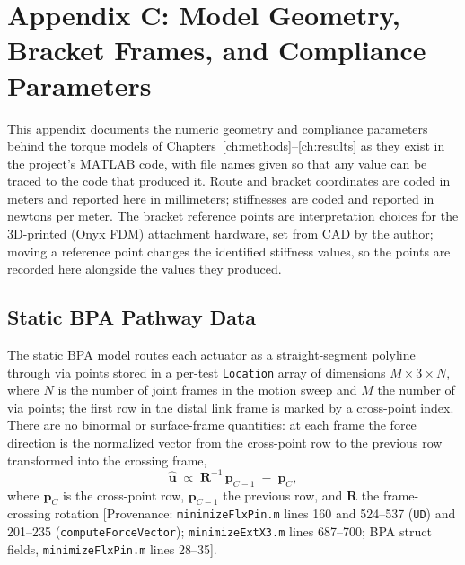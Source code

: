\chapter{Appendix C: Model Geometry, Bracket Frames, and Compliance Parameters}\label{app:model_geometry}
\graphicspath{{figs/94-AppendixC/}}

This appendix documents the numeric geometry and compliance parameters behind the torque models of Chapters~\ref{ch:methods}--\ref{ch:results} as they exist in the project's MATLAB code, with file names given so that any value can be traced to the code that produced it. Route and bracket coordinates are coded in meters and reported here in millimeters; stiffnesses are coded and reported in newtons per meter. The bracket reference points are interpretation choices for the 3D-printed (Onyx FDM) attachment hardware, set from CAD by the author; moving a reference point changes the identified stiffness values, so the points are recorded here alongside the values they produced.

\section{Static BPA Pathway Data}

The static BPA model routes each actuator as a straight-segment polyline through via points stored in a per-test \texttt{Location} array of dimensions $M\times3\times N$, where $N$ is the number of joint frames in the motion sweep and $M$ the number of via points; the first row in the distal link frame is marked by a cross-point index. There are no binormal or surface-frame quantities: at each frame the force direction is the normalized vector from the cross-point row to the previous row transformed into the crossing frame,
\begin{equation}
    \hat{\mathbf{u}} \;\propto\; \mathbf{R}^{-1}\,\mathbf{p}_{C-1} \;-\; \mathbf{p}_{C},
    \label{eq:app_forcedir}
\end{equation}
where $\mathbf{p}_{C}$ is the cross-point row, $\mathbf{p}_{C-1}$ the previous row, and $\mathbf{R}$ the frame-crossing rotation [Provenance: \texttt{minimizeFlxPin.m} lines 160 and 524--537 (\texttt{UD}) and 201--235 (\texttt{computeForceVector}); \texttt{minimizeExtX3.m} lines 687--700; BPA struct fields, \texttt{minimizeFlxPin.m} lines 28--35].

